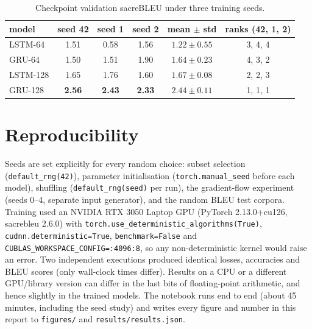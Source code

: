 \documentclass[10pt,a4paper]{article}
\newcommand{\code}[1]{\texttt{#1}}
\begin{document}
\begin{table}[H]
\centering\small
\begin{tabular}{lccccc}
\toprule
model & seed 42 & seed 1 & seed 2 & mean $\pm$ std & ranks (42, 1, 2) \\
\midrule
LSTM-64  & 1.51 & 0.58 & 1.56 & $1.22\pm0.55$ & 3, 4, 4 \\
GRU-64   & 1.50 & 1.51 & 1.90 & $1.64\pm0.23$ & 4, 3, 2 \\
LSTM-128 & 1.65 & 1.76 & 1.60 & $1.67\pm0.08$ & 2, 2, 3 \\
GRU-128  & \textbf{2.56} & \textbf{2.43} & \textbf{2.33} & $\mathbf{2.44\pm0.11}$ & 1, 1, 1 \\
\bottomrule
\end{tabular}
\caption{Checkpoint validation sacreBLEU under three training seeds.}
\label{tab:seeds}
\end{table}

\section{Reproducibility}
Seeds are set explicitly for every random choice: subset selection (\code{default\_rng(42)}), parameter
initialisation (\code{torch.manual\_seed} before each model), shuffling (\code{default\_rng(seed)} per run),
the gradient-flow experiment (seeds 0--4, separate input generator), and the random BLEU test corpora. Training
used an NVIDIA RTX 3050 Laptop GPU (PyTorch 2.13.0+cu126, sacrebleu 2.6.0) with
\code{torch.use\_deterministic\_algorithms(True)}, \code{cudnn.deterministic=True}, \code{benchmark=False} and
\code{CUBLAS\_WORKSPACE\_CONFIG=:4096:8}, so any non-deterministic kernel would raise an error. Two independent
executions produced identical losses, accuracies and BLEU scores (only wall-clock times differ). Results on a CPU or a different GPU/library
version can differ in the last bits of floating-point arithmetic, and hence slightly in the trained models.
The notebook runs end to end (about 45 minutes, including the seed study) and writes every figure and number in
this report to \code{figures/} and \code{results/results.json}.
\end{document}
